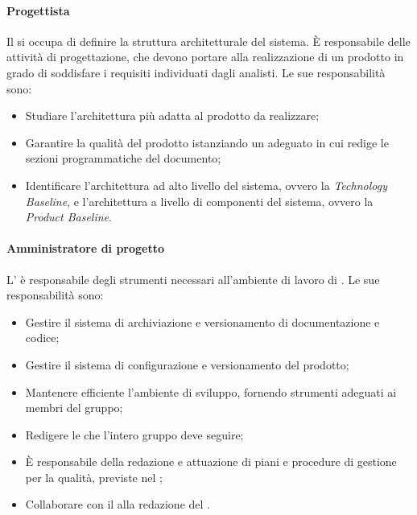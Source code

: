 \paragraph{Progettista}
Il \roleDesigner{} si occupa di definire la struttura architetturale del sistema. È responsabile delle attività di progettazione, che devono portare alla realizzazione di un prodotto in grado di soddisfare i requisiti individuati dagli analisti. Le sue responsabilità sono:
\begin{itemize}
	\item Studiare l'architettura più adatta al prodotto da realizzare;
	\item Garantire la qualità del prodotto istanziando un adeguato \docNameVersionPdQ{} in cui redige le sezioni programmatiche del documento;
	\item Identificare l'architettura ad alto livello del sistema, ovvero la \textit{Technology Baseline}, e l'architettura a livello di componenti del sistema, ovvero la  \textit{Product Baseline}.
\end{itemize}

\paragraph{Amministratore di progetto}
L'\roleAdministrator{} è responsabile degli strumenti necessari all'ambiente di lavoro di \groupName.
Le sue responsabilità sono: 
\begin{itemize}
	\item Gestire il sistema di archiviazione e versionamento di documentazione e codice;
	\item Gestire il sistema di configurazione e versionamento del prodotto;
	\item Mantenere efficiente l'ambiente di sviluppo, fornendo strumenti adeguati ai membri del gruppo;
	\item Redigere le \docNameVersionNdP{} che l'intero gruppo deve seguire;
	\item È responsabile della redazione e attuazione di piani e procedure di gestione per la qualità, previste nel \docNameVersionPdQ{};
	\item Collaborare con il \roleProjectManager{} alla redazione del \docNameVersionPdP.
\end{itemize}

